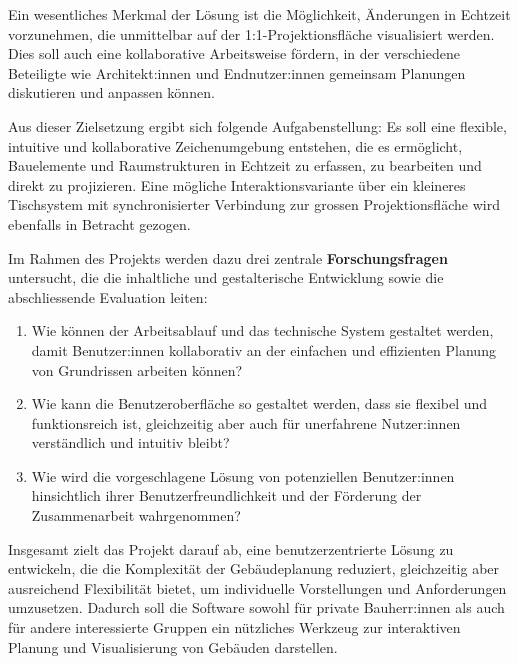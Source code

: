 Ein wesentliches Merkmal der Lösung ist die Möglichkeit, Änderungen in Echtzeit vorzunehmen, die unmittelbar auf der 1:1-Projektionsfläche visualisiert werden. Dies soll auch eine kollaborative Arbeitsweise fördern, in der verschiedene Beteiligte wie Architekt:innen und Endnutzer:innen gemeinsam Planungen diskutieren und anpassen können.

Aus dieser Zielsetzung ergibt sich folgende Aufgabenstellung: Es soll eine flexible, intuitive und kollaborative Zeichenumgebung entstehen, die es ermöglicht, Bauelemente und Raumstrukturen in Echtzeit zu erfassen, zu bearbeiten und direkt zu projizieren. Eine mögliche Interaktionsvariante über ein kleineres Tischsystem mit synchronisierter Verbindung zur grossen Projektionsfläche wird ebenfalls in Betracht gezogen.

\clearpage

Im Rahmen des Projekts werden dazu drei zentrale \textbf{Forschungsfragen} untersucht, die die inhaltliche und gestalterische Entwicklung sowie die abschliessende Evaluation leiten:

\begin{enumerate}
    \item Wie können der Arbeitsablauf und das technische System gestaltet werden, damit Benutzer:innen kollaborativ an der einfachen und effizienten Planung von Grundrissen arbeiten können?
    \item Wie kann die Benutzeroberfläche so gestaltet werden, dass sie flexibel und funktionsreich ist, gleichzeitig aber auch für unerfahrene Nutzer:innen verständlich und intuitiv bleibt?
    \item Wie wird die vorgeschlagene Lösung von potenziellen Benutzer:innen hinsichtlich ihrer Benutzerfreundlichkeit und der Förderung der Zusammenarbeit wahrgenommen?
\end{enumerate}

Insgesamt zielt das Projekt darauf ab, eine benutzerzentrierte Lösung zu entwickeln, die die Komplexität der Gebäudeplanung reduziert, gleichzeitig aber ausreichend Flexibilität bietet, um individuelle Vorstellungen und Anforderungen umzusetzen. Dadurch soll die Software sowohl für private Bauherr:innen als auch für andere interessierte Gruppen ein nützliches Werkzeug zur interaktiven Planung und Visualisierung von Gebäuden darstellen.
